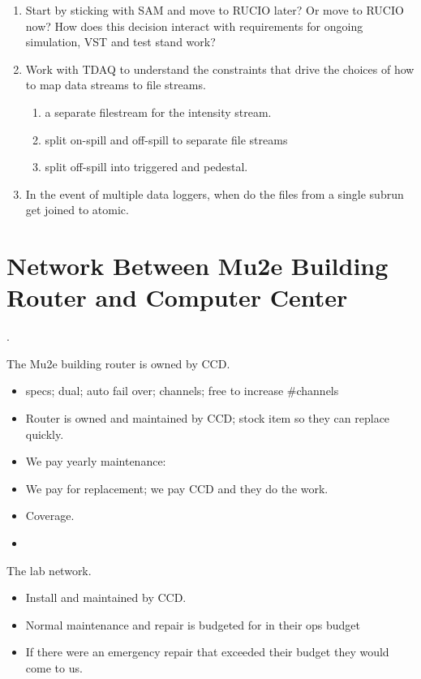 \begin{enumerate}
\item Start by sticking with SAM and move to RUCIO later?  Or move to RUCIO now?
  How does this decision interact with requirements for ongoing simulation, VST
  and test stand work?
\item Work with TDAQ to understand the constraints that drive the choices of how to
  map data streams to file streams.
  \begin{enumerate}
    \item a separate filestream for the intensity stream.
    \item split on-spill and off-spill to separate file streams
    \item split off-spill into triggered and pedestal.
  \end{enumerate}
\item In the event of multiple data loggers, when do the files from a single subrun get joined to atomic.
\end{enumerate}


\appendix

\chapter{Network Between Mu2e Building Router and Computer Center}
\label{app:RouterAndNetwork}.

The Mu2e building router is owned by CCD.
\begin{itemize}
\item specs; dual; auto fail over; channels; free to increase \#channels
\item Router is owned and maintained by CCD; stock item so they can replace quickly.
\item We pay yearly maintenance: 
\item We pay for replacement; we pay CCD and they do the work. 
\item {} Coverage.
\item {}
\end{itemize}


The lab network.
\begin{itemize}
\item Install and maintained by CCD.
\item Normal maintenance and repair is budgeted for in their ops budget
\item If there were an emergency repair that exceeded their budget they would come to us. 
\end{itemize}

